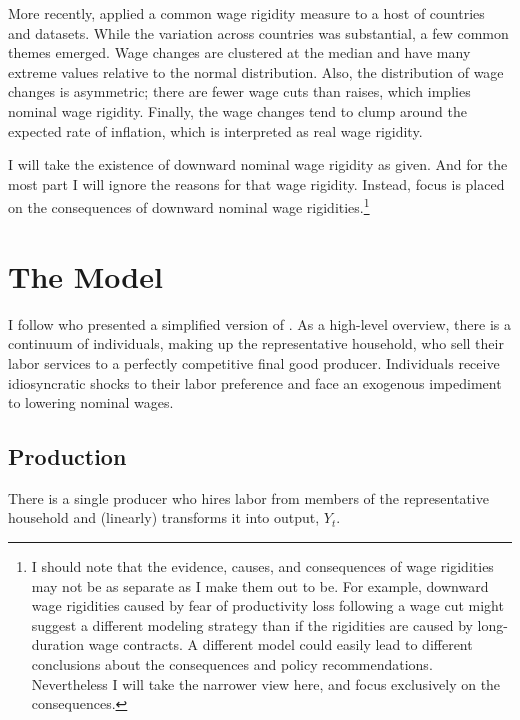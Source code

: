 \documentclass[12pt,a4paper]{scrartcl}            %
\begin{document}
More recently, \cite{dickens_et_al_2006} applied a common wage rigidity measure to a host of countries and datasets.
While the variation across countries was substantial, a few common themes emerged.
Wage changes are clustered at the median and have many extreme values relative to the normal distribution.
Also, the distribution of wage changes is asymmetric; there are fewer wage cuts than raises, which implies nominal wage rigidity.
Finally, the wage changes tend to clump around the expected rate of inflation, which is interpreted as real wage rigidity.

I will take the existence of downward nominal wage rigidity as given.
And for the most part I will ignore the reasons for that wage rigidity.
Instead, focus is placed on the consequences of downward nominal wage rigidities.\footnote{
    I should note that the evidence, causes, and consequences of wage rigidities may not be as separate as I make them out to be.
    For example, downward wage rigidities caused by fear of productivity loss following a wage cut might suggest a different modeling strategy than if the rigidities are caused by long-duration wage contracts.
    A different model could easily lead to different conclusions about the consequences and policy recommendations.
    Nevertheless I will take the narrower view here, and focus exclusively on the consequences.
}

\section{The Model}
\label{sec:the_model}

I follow \cite{daly_hobijn_2013} who presented a simplified version of \cite{benigno_ricci_2011}.
As a high-level overview, there is a continuum of individuals, making up the representative household, who sell their labor services to a perfectly competitive final good producer.
Individuals receive idiosyncratic shocks to their labor preference and face an exogenous impediment to lowering nominal wages.

\subsection{Production}
\label{sub:production}

There is a single producer who hires labor from members of the representative household and (linearly) transforms it into output, $Y_t$.
\end{document}
